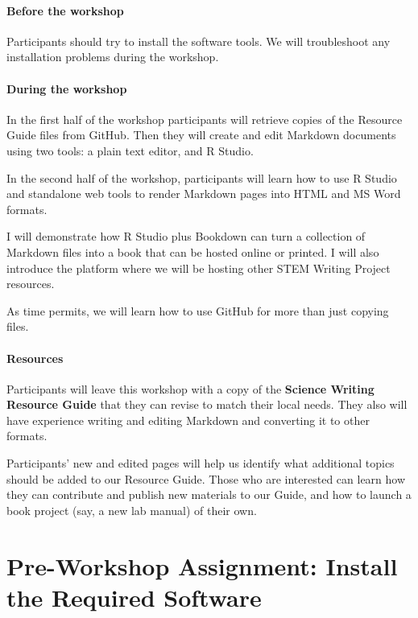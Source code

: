 \documentclass[
]{article}
\begin{document}
\hypertarget{before-the-workshop}{%
\paragraph{Before the workshop}\label{before-the-workshop}}

Participants should try to install the software tools. We will
troubleshoot any installation problems during the workshop.

\hypertarget{during-the-workshop}{%
\paragraph{During the workshop}\label{during-the-workshop}}

In the first half of the workshop participants will retrieve copies of
the Resource Guide files from GitHub. Then they will create and edit
Markdown documents using two tools: a plain text editor, and R Studio.

In the second half of the workshop, participants will learn how to use R
Studio and standalone web tools to render Markdown pages into HTML and
MS Word formats.

I will demonstrate how R Studio plus Bookdown can turn a collection of
Markdown files into a book that can be hosted online or printed. I will
also introduce the platform where we will be hosting other STEM Writing
Project resources.

As time permits, we will learn how to use GitHub for more than just
copying files.

\hypertarget{resources}{%
\paragraph{Resources}\label{resources}}

Participants will leave this workshop with a copy of the \textbf{Science
Writing Resource Guide} that they can revise to match their local needs.
They also will have experience writing and editing Markdown and
converting it to other formats.

Participants' new and edited pages will help us identify what additional
topics should be added to our Resource Guide. Those who are interested
can learn how they can contribute and publish new materials to our
Guide, and how to launch a book project (say, a new lab manual) of their
own.

\hypertarget{pre-workshop-assignment-install-the-required-software}{%
\section{Pre-Workshop Assignment: Install the Required
Software}\label{pre-workshop-assignment-install-the-required-software}}
\end{document}
